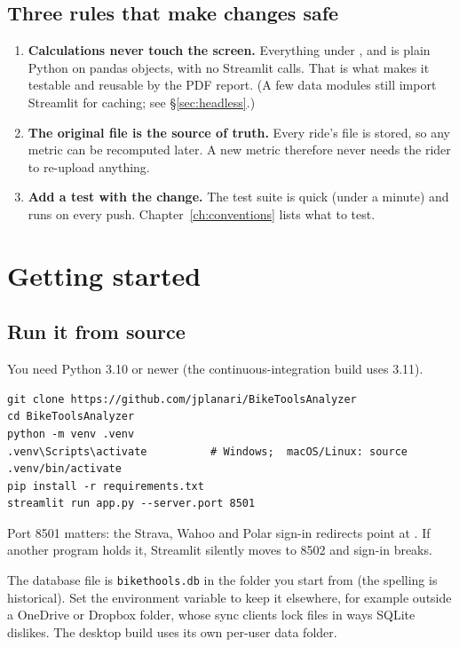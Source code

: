 \section*{Three rules that make changes safe}

\begin{enumerate}
\item \textbf{Calculations never touch the screen.} Everything under ,  and
   is plain Python on pandas objects, with no Streamlit calls. That is what makes it testable and
  reusable by the PDF report. (A few data modules still import Streamlit for caching; see \S\ref{sec:headless}.)
\item \textbf{The original file is the source of truth.} Every ride's file is stored, so any metric can be
  recomputed later. A new metric therefore never needs the rider to re-upload anything.
\item \textbf{Add a test with the change.} The test suite is quick (under a minute) and runs on every push.
  Chapter~\ref{ch:conventions} lists what to test.
\end{enumerate}

\chapter{Getting started}

\section{Run it from source}

You need Python 3.10 or newer (the continuous-integration build uses 3.11).

\begin{lstlisting}[style=plain]
git clone https://github.com/jplanari/BikeToolsAnalyzer
cd BikeToolsAnalyzer
python -m venv .venv
.venv\Scripts\activate          # Windows;  macOS/Linux: source .venv/bin/activate
pip install -r requirements.txt
streamlit run app.py --server.port 8501
\end{lstlisting}

Port 8501 matters: the Strava, Wahoo and Polar sign-in redirects point at . If another
program holds it, Streamlit silently moves to 8502 and sign-in breaks.

The database file is \texttt{bikethools.db} in the folder you start from (the spelling is historical). Set the
environment variable  to keep it elsewhere, for example outside a OneDrive or Dropbox folder,
whose sync clients lock files in ways SQLite dislikes. The desktop build uses its own per-user data folder.

